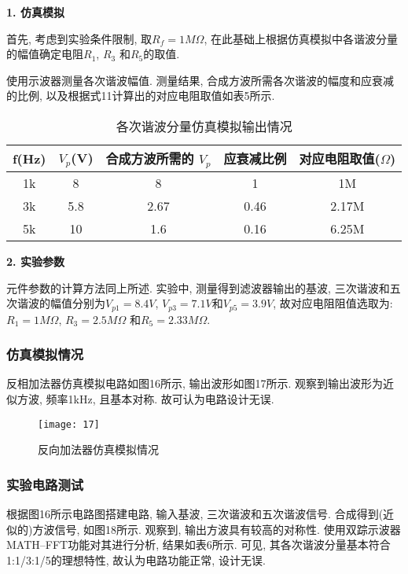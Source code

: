 \documentclass[UTF2]{ctexart}
\begin{document}
	\textbf{1. 仿真模拟}
	
	首先, 考虑到实验条件限制, 取$R_f = 1M \Omega$, 在此基础上根据仿真模拟中各谐波分量的幅值确定电阻$R_1$, $R_3$ 和$R_5$的取值.
	
	使用示波器测量各次谐波幅值. 测量结果, 合成方波所需各次谐波的幅度和应衰减的比例, 以及根据式11计算出的对应电阻取值如表5所示.
	
	\begin{table}[h]
		\centering
		\caption{各次谐波分量仿真模拟输出情况}
		\begin{tabular}{c c c c c}
			\hline
			f(Hz) & $V_p$(V) & 合成方波所需的 $V_p$ & 应衰减比例 & 对应电阻取值($\Omega$)  \\
			\hline
			1k & 8 & 8 & 1 & 1M\\
			3k & 5.8 & 2.67 & 0.46 & 2.17M\\
			5k & 10 & 1.6 & 0.16 & 6.25M\\
			\hline
		\end{tabular}
	\end{table}
	
	\textbf{2. 实验参数} 
	
	元件参数的计算方法同上所述. 实验中, 测量得到滤波器输出的基波, 三次谐波和五次谐波的幅值分别为$V_{p1} =  8.4V$, $V_{p3} =  7.1V$和$V_{p5} =  3.9V$, 故对应电阻阻值选取为: $R_1 = 1M\Omega$, $R_3 = 2.5M\Omega$ 和$R_5 = 2.33M\Omega$.
	
	\subsubsection{仿真模拟情况}
	
	反相加法器仿真模拟电路如图16所示, 输出波形如图17所示. 观察到输出波形为近似方波, 频率1kHz, 且基本对称. 故可认为电路设计无误.
	
	\begin{figure}[h]
		\centering
		\texttt{[image: 17]}
		\caption{反向加法器仿真模拟情况}
	\end{figure}
	
	\subsubsection{实验电路测试} 
	
	根据图16所示电路图搭建电路, 输入基波, 三次谐波和五次谐波信号. 合成得到(近似的)方波信号, 如图18所示. 观察到, 输出方波具有较高的对称性. 使用双踪示波器MATH--FFT功能对其进行分析, 结果如表6所示. 可见, 其各次谐波分量基本符合1:1/3:1/5的理想特性, 故认为电路功能正常, 设计无误.
	
\end{document}
